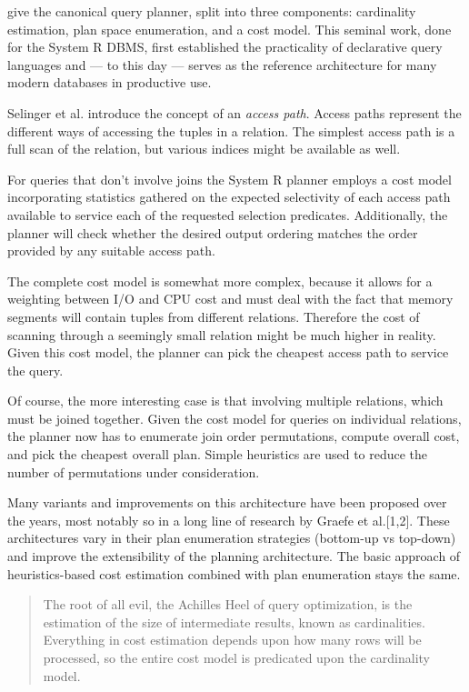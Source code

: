 \documentclass[../index.tex]{subfiles}
\begin{document}
\cite{selinger1979access} give the canonical query planner, split into
three components: cardinality estimation, plan space enumeration, and
a cost model. This seminal work, done for the System R DBMS, first
established the practicality of declarative query languages and — to
this day — serves as the reference architecture for many modern
databases in productive use.

Selinger et al. introduce the concept of an \emph{access path}. Access
paths represent the different ways of accessing the tuples in a
relation. The simplest access path is a full scan of the relation, but
various indices might be available as well.

For queries that don't involve joins the System R planner employs a
cost model incorporating statistics gathered on the expected
selectivity of each access path available to service each of the
requested selection predicates. Additionally, the planner will check
whether the desired output ordering matches the order provided by any
suitable access path.

The complete cost model is somewhat more complex, because it allows
for a weighting between I/O and CPU cost and must deal with the fact
that memory segments will contain tuples from different
relations. Therefore the cost of scanning through a seemingly small
relation might be much higher in reality. Given this cost model, the
planner can pick the cheapest access path to service the query.

Of course, the more interesting case is that involving multiple
relations, which must be joined together. Given the cost model for
queries on individual relations, the planner now has to enumerate join
order permutations, compute overall cost, and pick the cheapest
overall plan. Simple heuristics are used to reduce the number of
permutations under consideration.

Many variants and improvements on this architecture have been proposed
over the years, most notably so in a long line of research by Graefe
et al.[1,2]. These architectures vary in their plan enumeration
strategies (bottom-up vs top-down) and improve the extensibility of
the planning architecture. The basic approach of heuristics-based cost
estimation combined with plan enumeration stays the same.

\begin{quote}
The root of all evil, the Achilles Heel of query optimization, is the
estimation of the size of intermediate results, known as
cardinalities. Everything in cost estimation depends upon how many
rows will be processed, so the entire cost model is predicated upon
the cardinality model.

\cite{lohman2014query}
\end{quote}
\end{document}
